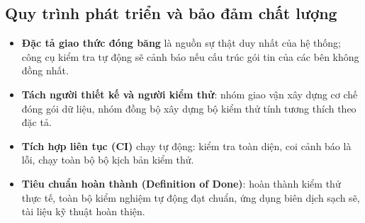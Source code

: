 \subsection{Quy trình phát triển và bảo đảm chất lượng}
\begin{itemize}
  \item \textbf{Đặc tả giao thức đóng băng} là nguồn sự thật duy nhất của hệ thống; công cụ kiểm tra tự động sẽ cảnh báo nếu cấu trúc gói tin của các bên không đồng nhất.
  \item \textbf{Tách người thiết kế và người kiểm thử}: nhóm giao vận xây dựng cơ chế đóng gói dữ liệu, nhóm đồng bộ xây dựng bộ kiểm thử tính tương thích theo đặc tả.
  \item \textbf{Tích hợp liên tục (CI)} chạy tự động: kiểm tra toàn diện, coi cảnh báo là lỗi, chạy toàn bộ bộ kịch bản kiểm thử.
  \item \textbf{Tiêu chuẩn hoàn thành (Definition of Done)}: hoàn thành kiểm thử thực tế, toàn bộ kiểm nghiệm tự động đạt chuẩn, ứng dụng biên dịch sạch sẽ, tài liệu kỹ thuật hoàn thiện.
\end{itemize}
